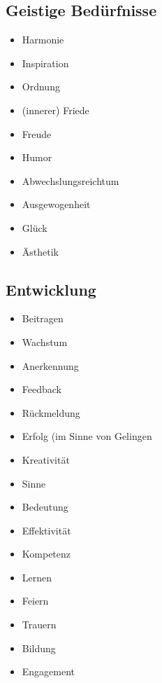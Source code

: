 \subsection{Geistige Bedürfnisse}

\begin{multicols}{2}
  \begin{itemize}
    \item Harmonie
    \item Inspiration
    \item \glqq Ordnung \grqq
    \item (innerer) Friede
    \item Freude
    \item Humor
    \item Abwechslungsreichtum
    \item Ausgewogenheit
    \item Glück
    \item Ästhetik
  \end{itemize}
\end{multicols}


\subsection{Entwicklung}

\begin{multicols}{2}
  \begin{itemize}
    \item Beitragen
    \item Wachstum
    \item Anerkennung
    \item Feedback
    \item Rückmeldung
    \item Erfolg (im Sinne von \glqq Gelingen\grqq
    \item Kreativität
    \item Sinne
    \item Bedeutung
    \item Effektivität
    \item Kompetenz
    \item Lernen
    \item Feiern
    \item Trauern
    \item Bildung
    \item Engagement
  \end{itemize}
\end{multicols}
